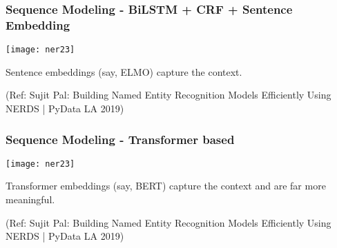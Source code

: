 \begin{frame}[fragile]\frametitle{Sequence Modeling - BiLSTM + CRF + Sentence Embedding}

\begin{center}
\texttt{[image: ner23]}
\end{center}

Sentence embeddings (say, ELMO) capture the context.

{\tiny (Ref: Sujit Pal: Building Named Entity Recognition Models Efficiently Using NERDS | PyData LA 2019)}

\end{frame}


\begin{frame}[fragile]\frametitle{Sequence Modeling - Transformer based}

\begin{center}
\texttt{[image: ner23]}
\end{center}

Transformer embeddings (say, BERT) capture the context and are far more meaningful. 

{\tiny (Ref: Sujit Pal: Building Named Entity Recognition Models Efficiently Using NERDS | PyData LA 2019)}

\end{frame}


	




